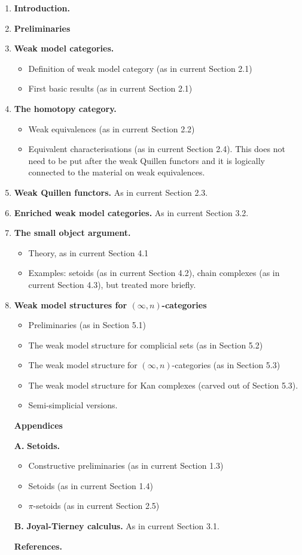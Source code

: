 \documentclass[11pt, oneside]{article}   	%
\begin{document}
\begin{enumerate} 
\item {\bf Introduction.}
\item {\bf  Preliminaries}
\item {\bf  Weak model categories.} 
\begin{itemize}
\item Definition of weak model category (as in current Section 2.1)
\item First basic results (as in current Section 2.1)
\end{itemize}
\item {\bf The homotopy category.}
\begin{itemize}
\item Weak equivalences (as in current Section 2.2)
\item Equivalent characterisations (as in current Section 2.4). This does not need to be put after the weak Quillen functors and it is logically connected to the material on weak equivalences. 
\end{itemize}
\item {\bf Weak Quillen functors.} As in current Section 2.3.
\item {\bf Enriched weak model categories.} As in current Section 3.2. 
\item {\bf The small object argument.} 
\begin{itemize}
\item Theory, as in current Section 4.1 
\item Examples: setoids (as in current Section 4.2), chain complexes (as in current Section 4.3), but treated more briefly. 
\end{itemize}
\item {\bf Weak model structures for $(\infty, n)$-categories} 
\begin{itemize}
\item Preliminaries (as in Section 5.1)
\item The weak model structure for complicial sets (as in Section 5.2)
\item The weak model structure for $(\infty, n)$-categories (as in Section 5.3)
\item The weak model structure for Kan complexes (carved out of Section 5.3).
\item Semi-simplicial versions. 
\end{itemize} 
\item[]  \hspace{-5ex} {\bf Appendices} 
\item[{\bf A.}]  {\bf Setoids.} 
\begin{itemize}
\item Constructive preliminaries (as in current Section 1.3)
\item Setoids (as in current Section 1.4)
\item $\pi$-setoids (as in current Section 2.5)
\end{itemize} 
\item[{\bf B.}] {\bf Joyal-Tierney calculus.} As in current Section 3.1.
\item[] \hspace{-5ex} {\bf References.}
\end{enumerate}
\end{document}
